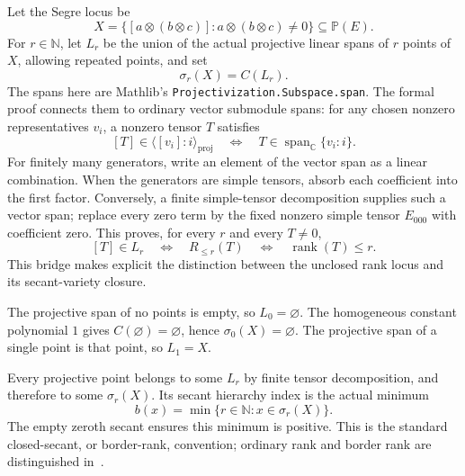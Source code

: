 \documentclass[11pt,a4paper]{article}
\newcommand{\C}{\mathbb C}
\newcommand{\N}{\mathbb N}
\newcommand{\PP}{\mathbb P}
\newcommand{\rk}{\operatorname{rank}}
\newcommand{\code}[1]{\nolinkurl{#1}}
\begin{document}
Let the Segre locus be
\[
X=\bigl\{[a\otimes(b\otimes c)]:a\otimes(b\otimes c)\ne0\bigr\}\subseteq\PP(E).
\]
For $r\in\N$, let $L_r$ be the union of the actual projective linear spans of $r$ points of $X$, allowing repeated points, and set
\begin{equation}\label{eq:secant}
\sigma_r(X)=C(L_r).
\end{equation}
The spans here are Mathlib's \code{Projectivization.Subspace.span}. The formal proof connects them to ordinary vector submodule spans: for any chosen nonzero representatives $v_i$, a nonzero tensor $T$ satisfies
\[
[T]\in\langle[v_i]:i\rangle_{\mathrm{proj}}
\quad\Longleftrightarrow\quad
T\in\operatorname{span}_{\C}\{v_i:i\}.
\]
For finitely many generators, write an element of the vector span as a linear combination. When the generators are simple tensors, absorb each coefficient into the first factor. Conversely, a finite simple-tensor decomposition supplies such a vector span; replace every zero term by the fixed nonzero simple tensor $E_{000}$ with coefficient zero. This proves, for every $r$ and every $T\ne0$,
\begin{equation}\label{eq:spanrank}
[T]\in L_r\quad\Longleftrightarrow\quad R_{\le r}(T)
\quad\Longleftrightarrow\quad\rk(T)\le r.
\end{equation}
This bridge makes explicit the distinction between the unclosed rank locus and its secant-variety closure.

The projective span of no points is empty, so $L_0=\varnothing$. The homogeneous constant polynomial $1$ gives $C(\varnothing)=\varnothing$, hence $\sigma_0(X)=\varnothing$. The projective span of a single point is that point, so $L_1=X$.

Every projective point belongs to some $L_r$ by finite tensor decomposition, and therefore to some $\sigma_r(X)$. Its secant hierarchy index is the actual minimum
\begin{equation}\label{eq:index}
b(x)=\min\{r\in\N:x\in\sigma_r(X)\}.
\end{equation}
The empty zeroth secant ensures this minimum is positive. This is the standard closed-secant, or border-rank, convention; ordinary rank and border rank are distinguished in~\cite{landsberg}.

\newpage
\end{document}
